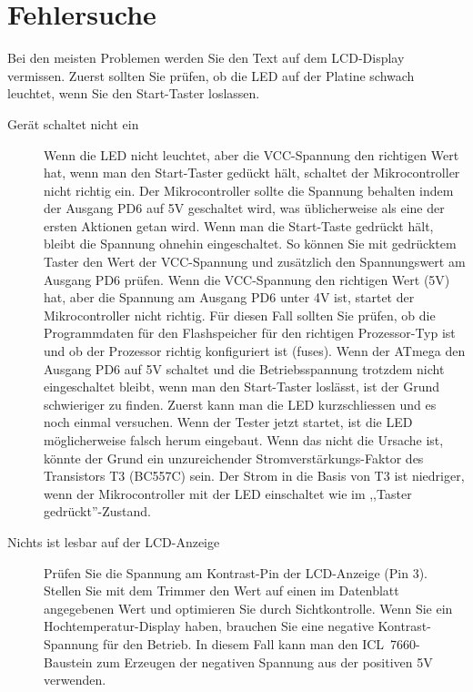 \section{Fehlersuche}
Bei den meisten Problemen werden Sie den Text auf dem LCD-Display vermissen.
Zuerst sollten Sie prüfen, ob die LED auf der Platine schwach leuchtet, wenn Sie den Start-Taster
loslassen.
\begin{description}

\item[Gerät schaltet nicht ein]  
Wenn die LED nicht leuchtet, aber die VCC-Spannung den richtigen Wert hat, wenn
man den Start-Taster gedückt hält, schaltet der Mikrocontroller nicht richtig ein.
Der Mikrocontroller sollte die Spannung behalten indem der Ausgang PD6 auf 5V
geschaltet wird, was üblicherweise als eine der ersten Aktionen getan wird.
Wenn man die Start-Taste gedrückt hält, bleibt die Spannung ohnehin eingeschaltet.
So können Sie mit gedrücktem Taster den Wert der VCC-Spannung und zusätzlich den Spannungswert am
Ausgang PD6 prüfen.
Wenn die VCC-Spannung den richtigen Wert (5V) hat, aber die Spannung am Ausgang
PD6 unter 4V ist, startet der Mikrocontroller nicht richtig.
Für diesen Fall sollten Sie prüfen, ob die Programmdaten für den Flashspeicher
für den richtigen Prozessor-Typ ist und ob der Prozessor richtig konfiguriert ist (fuses).
Wenn der ATmega den Ausgang PD6 auf 5V schaltet und die Betriebsspannung 
trotzdem nicht eingeschaltet bleibt, wenn man den Start-Taster loslässt, ist der
Grund schwieriger zu finden.
Zuerst kann man die LED kurzschliessen und es noch einmal versuchen.
Wenn der Tester jetzt startet, ist die LED möglicherweise falsch herum eingebaut.
Wenn das nicht die Ursache ist, könnte der Grund ein unzureichender Stromverstärkungs-Faktor
des Transistors T3 (BC557C) sein.
Der Strom in die Basis von T3 ist niedriger, wenn der Mikrocontroller mit der LED einschaltet
wie im ,,Taster gedrückt''-Zustand.

\item[Nichts ist lesbar auf der LCD-Anzeige] 
Prüfen Sie die Spannung am Kontrast-Pin der LCD-Anzeige (Pin 3).
Stellen Sie mit dem Trimmer den Wert auf einen im Datenblatt angegebenen Wert und optimieren Sie
durch Sichtkontrolle.
Wenn Sie ein Hochtemperatur-Display haben, brauchen Sie eine negative Kontrast-Spannung für
den Betrieb.
In diesem Fall kann man den ICL~7660-Baustein zum Erzeugen der negativen Spannung aus der
positiven 5V verwenden.


\end{description}
